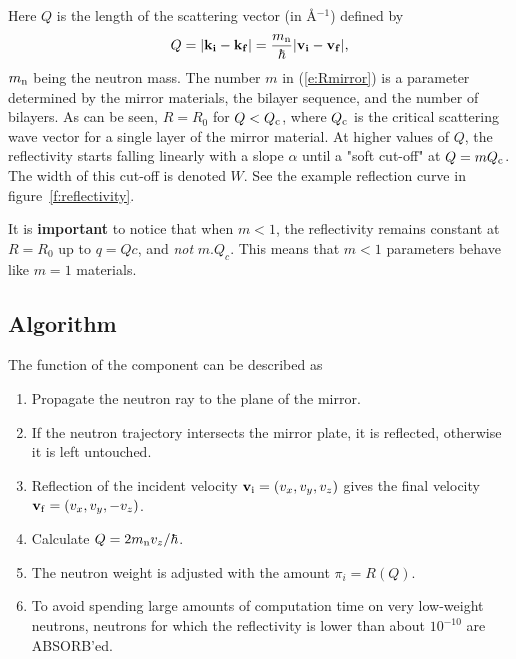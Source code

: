 Here $Q$ is the length of the scattering vector (in \AA$^{-1}$)
defined by
\begin{equation} \label{e:reflectivity}
Q = |{\bf k}_{\bf i} - {\bf k}_{\bf f}|
  = \frac{m_{\rm n}}{\hbar} |{\bf v}_{\bf i} - {\bf v}_{\bf f}|,
\end{equation}
$m_{\rm n}$ being the neutron mass.
The number $m$ in (\ref{e:Rmirror}) is a parameter determined by
the mirror materials,
the bilayer sequence, and the number of bilayers.
As can be seen, $R=R_0$ for $Q < Q_{\rm c}$, where $Q_{\rm c}$ is the
critical scattering wave vector for a single layer of the mirror
material. At higher values of $Q$, the reflectivity starts falling
linearly with a slope $\alpha$ until a "soft cut-off" at $Q = m Q_{\rm c}$.
The width of this cut-off is denoted $W$. See the example reflection curve in
figure~\ref{f:reflectivity}.

It is {\bf important} to notice that when $m < 1$, the reflectivity remains constant at $R=R_0$ up to $q=Qc$, and \emph{not} $m.Q_c$. This means that $m < 1$ parameters behave like $m=1$ materials.

\subsection{Algorithm}
The function of the component can be described as
\begin{enumerate}
\item Propagate the neutron ray to the plane of the mirror.
\item If the neutron trajectory intersects the mirror plate, it is
reflected, otherwise it is left untouched.
\item Reflection of the incident velocity
${\bf v}_{\rm i} = (v_x,v_y,v_z)$
gives the final velocity ${\bf v}_{\rm f} = (v_x,v_y,-v_z)$.
\item Calculate $Q=2 m_{\rm n} v_z / \hbar$.
\item The neutron weight is adjusted with the amount $\pi_i = R(Q)$.
\item  To avoid spending large amounts of computation time on very low-weight
neutrons, neutrons for which the reflectivity is lower than about
$10^{-10}$ are ABSORB'ed.
\end{enumerate}

